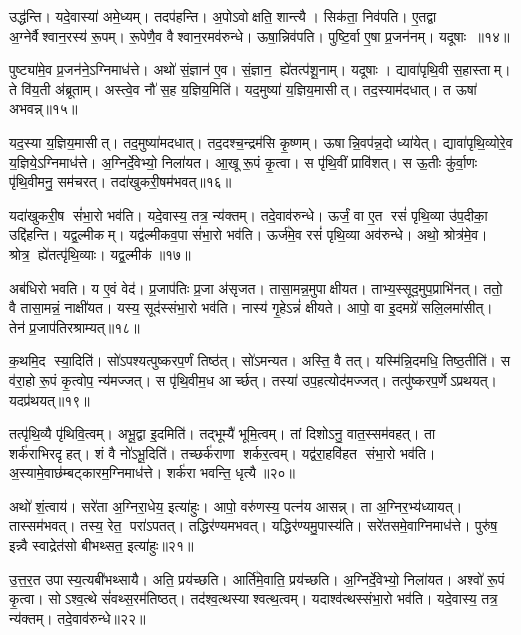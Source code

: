 उद्ध॑न्ति। यदे॒वास्या॑ अमे॒ध्यम्। तदप॑हन्ति। अ॒पोऽवोक्षति॒ शान्त्यै। सिक॑ता॒ निव॑पति। ए॒तद्वा अ॒ग्नेर्वैश्वान॒रस्य॑ रू॒पम्। रू॒पेणै॒व वैश्वान॒रमव॑रुन्धे। ऊषा॒न्निव॑पति। पुष्टि॒र्वा ए॒षा प्र॒जन॑नम्। यदूषाः ॥१४॥

पुष्ट्या॑मे॒व प्र॒जन॑ने॒ऽग्निमाध॑त्ते। अथो॑ सं॒ज्ञान॑ ए॒व। सं॒ज्ञान॒ ह्ये॑तत्प॑शू॒नाम्। यदूषाः। द्यावा॑पृथि॒वी स॒हास्ताम्। ते वि॑य॒ती अ॑ब्रूताम्। अस्त्वे॒व नौ॑ स॒ह य॒ज्ञिय॒मिति॑। यद॒मुष्या॑ य॒ज्ञिय॒मासीत्। तद॒स्याम॑दधात्। त ऊषा॑ अभवन्न्॥१५॥

यद॒स्या य॒ज्ञिय॒मासीत्। तद॒मुष्या॑मदधात्। तद॒दश्च॒न्द्रम॑सि कृ॒ष्णम्। ऊषान्नि॒वप॑न्न॒दो ध्या॑येत्। द्यावा॑पृथि॒व्योरे॒व य॒ज्ञिये॒ऽग्निमाध॑त्ते। अ॒ग्निर्दे॒वेभ्यो॒ निला॑यत। आ॒खू रू॒पं कृ॒त्वा। स पृ॑थि॒वीं प्रावि॑शत्। स ऊ॒तीः कु॑र्वा॒णः पृ॑थि॒वीमनु॒ सम॑चरत्। तदा॑खुकरी॒षम॑भवत्॥१६॥

यदा॑खुकरी॒ष सं॑भा॒रो भव॑ति। यदे॒वास्य॒ तत्र॒ न्य॑क्तम्। तदे॒वाव॑रुन्धे। ऊर्जं॒ वा ए॒त रसं॑ पृथि॒व्या उ॑प॒दीका॒ उद्दि॑हन्ति। यद्व॒ल्मीकम्। यद्व॑ल्मीकव॒पा सं॑भा॒रो भव॑ति। ऊर्ज॑मे॒व रसं॑ पृथि॒व्या अव॑रुन्धे। अथो॒ श्रोत्र॑मे॒व। श्रोत्र॒ ह्ये॑तत्पृ॑थि॒व्याः। यद्व॒ल्मीक॑॥१७॥

अब॑धिरो भवति। य ए॒वं वेद॑। प्र॒जाप॑तिः प्र॒जा अ॑सृजत। तासा॒मन्न॒मुपाक्षीयत। ताभ्य॒स्सूद॒मुप॒प्राभि॑नत्। ततो॒ वै तासा॒मन्नं॒ नाक्षी॑यत। यस्य॒ सूद॑स्संभा॒रो भव॑ति। नास्य॑ गृ॒हेऽन्नं॑ क्षीयते। आपो॒ वा इ॒दमग्रे॑ सलि॒लमा॑सीत्। तेन॑ प्र॒जाप॑तिरश्राम्यत्॥१८॥

क॒थमि॒द स्या॒दिति॑। सो॑ऽपश्यत्पुष्करप॒र्णं तिष्ठ॑त्। सो॑ऽमन्यत। अस्ति॒ वै तत्। यस्मि॑न्नि॒दमधि॒ तिष्ठ॒तीति॑। स व॑रा॒हो रू॒पं कृ॒त्वोप॒ न्य॑मज्जत्। स पृ॑थि॒वीम॒ध आर्च्छत्। तस्या॑ उप॒हत्योद॑मज्जत्। तत्पु॑ष्करप॒र्णेऽप्रथयत्। यदप्र॑थयत्॥१९॥

तत्पृ॑थि॒व्यै पृ॑थिवि॒त्वम्। अभू॒द्वा इ॒दमिति॑। तद्भूम्यै॑ भूमि॒त्वम्। तां दिशोऽनु॒ वात॒स्सम॑वहत्। ता शर्क॑राभिरदृहत्। शं वै नो॑ऽभू॒दिति॑। तच्छर्क॑राणा शर्कर॒त्वम्। यद्व॑रा॒हवि॑हत संभा॒रो भव॑ति। अ॒स्यामे॒वाछ॑म्बट्कारम॒ग्निमाध॑त्ते। शर्क॑रा भवन्ति॒ धृत्यै॥२०॥

अथो॑ शं॒त्वाय॑। सरे॑ता अ॒ग्निरा॒धेय॒ इत्या॑हुः। आपो॒ वरु॑णस्य॒ पत्न॑य आसन्न्। ता अ॒ग्निर॒भ्य॑ध्यायत्। तास्सम॑भवत्। तस्य॒ रेत॒ परा॑ऽपतत्। तद्धिर॑ण्यमभवत्। यद्धिर॑ण्यमु॒पास्य॑ति। सरे॑तसमे॒वाग्निमाध॑त्ते। पुरु॑ष॒ इन्न्वै स्वाद्रेत॑सो बीभथ्सत॒ इत्या॑हुः॥२१॥

उ॒त्त॒र॒त उपास्य॒त्यबी॑भथ्सायै। अति॒ प्रय॑च्छति। आर्ति॑मे॒वाति॒ प्रय॑च्छति। अ॒ग्निर्दे॒वेभ्यो॒ निला॑यत। अश्वो॑ रू॒पं कृ॒त्वा। सोऽश्व॒त्थे सं॑वथ्स॒रम॑तिष्ठत्। तद॑श्व॒त्थस्याश्वत्थ॒त्वम्। यदाश्व॑त्थस्संभा॒रो भव॑ति। यदे॒वास्य॒ तत्र॒ न्य॑क्तम्। तदे॒वाव॑रुन्धे॥२२॥


